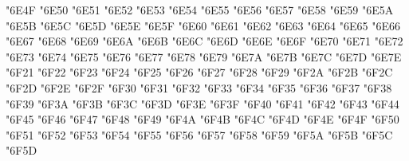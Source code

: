 {\Uchar\jis"6E4F %
\Uchar\jis"6E50 %
\Uchar\jis"6E51 %
\Uchar\jis"6E52 %
\Uchar\jis"6E53 %
\Uchar\jis"6E54 %
\Uchar\jis"6E55 %
\Uchar\jis"6E56 %
\Uchar\jis"6E57 %
\Uchar\jis"6E58 %
\Uchar\jis"6E59 %
\Uchar\jis"6E5A %
\Uchar\jis"6E5B %
\Uchar\jis"6E5C %
\Uchar\jis"6E5D %
\Uchar\jis"6E5E %
\Uchar\jis"6E5F %
\Uchar\jis"6E60 %
\Uchar\jis"6E61 %
\Uchar\jis"6E62 %
\Uchar\jis"6E63 %
\Uchar\jis"6E64 %
\Uchar\jis"6E65 %
\Uchar\jis"6E66 %
\Uchar\jis"6E67 %
\Uchar\jis"6E68 %
\Uchar\jis"6E69 %
\Uchar\jis"6E6A %
\Uchar\jis"6E6B %
\Uchar\jis"6E6C %
\Uchar\jis"6E6D %
\Uchar\jis"6E6E %
\Uchar\jis"6E6F %
\Uchar\jis"6E70 %
\Uchar\jis"6E71 %
\Uchar\jis"6E72 %
\Uchar\jis"6E73 %
\Uchar\jis"6E74 %
\Uchar\jis"6E75 %
\Uchar\jis"6E76 %
\Uchar\jis"6E77 %
\Uchar\jis"6E78 %
\Uchar\jis"6E79 %
\Uchar\jis"6E7A %
\Uchar\jis"6E7B %
\Uchar\jis"6E7C %
\Uchar\jis"6E7D %
\Uchar\jis"6E7E %
\Uchar\jis"6F21 %
\Uchar\jis"6F22 %
\Uchar\jis"6F23 %
\Uchar\jis"6F24 %
\Uchar\jis"6F25 %
\Uchar\jis"6F26 %
\Uchar\jis"6F27 %
\Uchar\jis"6F28 %
\Uchar\jis"6F29 %
\Uchar\jis"6F2A %
\Uchar\jis"6F2B %
\Uchar\jis"6F2C %
\Uchar\jis"6F2D %
\Uchar\jis"6F2E %
\Uchar\jis"6F2F %
\Uchar\jis"6F30 %
\Uchar\jis"6F31 %
\Uchar\jis"6F32 %
\Uchar\jis"6F33 %
\Uchar\jis"6F34 %
\Uchar\jis"6F35 %
\Uchar\jis"6F36 %
\Uchar\jis"6F37 %
\Uchar\jis"6F38 %
\Uchar\jis"6F39 %
\Uchar\jis"6F3A %
\Uchar\jis"6F3B %
\Uchar\jis"6F3C %
\Uchar\jis"6F3D %
\Uchar\jis"6F3E %
\Uchar\jis"6F3F %
\Uchar\jis"6F40 %
\Uchar\jis"6F41 %
\Uchar\jis"6F42 %
\Uchar\jis"6F43 %
\Uchar\jis"6F44 %
\Uchar\jis"6F45 %
\Uchar\jis"6F46 %
\Uchar\jis"6F47 %
\Uchar\jis"6F48 %
\Uchar\jis"6F49 %
\Uchar\jis"6F4A %
\Uchar\jis"6F4B %
\Uchar\jis"6F4C %
\Uchar\jis"6F4D %
\Uchar\jis"6F4E %
\Uchar\jis"6F4F %
\Uchar\jis"6F50 %
\Uchar\jis"6F51 %
\Uchar\jis"6F52 %
\Uchar\jis"6F53 %
\Uchar\jis"6F54 %
\Uchar\jis"6F55 %
\Uchar\jis"6F56 %
\Uchar\jis"6F57 %
\Uchar\jis"6F58 %
\Uchar\jis"6F59 %
\Uchar\jis"6F5A %
\Uchar\jis"6F5B %
\Uchar\jis"6F5C %
\Uchar\jis"6F5D %
}
